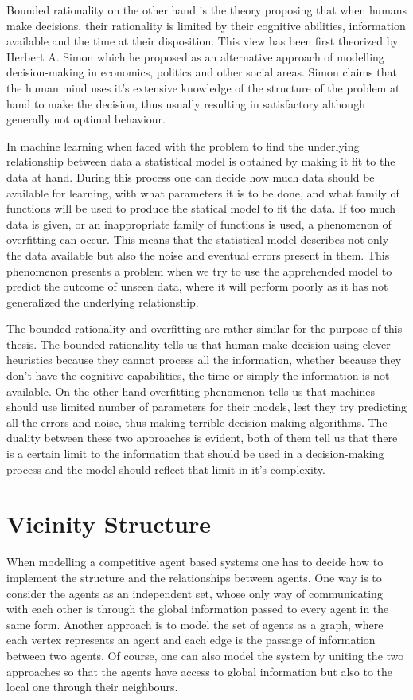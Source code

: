 Bounded rationality on the other hand is the theory proposing that when humans make decisions, their rationality is limited by their cognitive abilities, information available and the time at their disposition.
This view has been first theorized by Herbert A. Simon which he proposed as an alternative approach of modelling decision-making in economics, politics and other social areas. 
Simon claims that the human mind uses it's extensive knowledge of the structure of the problem at hand to make the decision, thus usually resulting in satisfactory although generally not optimal behaviour.

In machine learning when faced with the problem to find the underlying relationship between data a statistical model is obtained by making it fit to the data at hand.
During this process one can decide how much data should be available for learning, with what parameters it is to be done, and what family of functions will be used to produce the statical model to fit the data.
If too much data is given, or an inappropriate family of functions is used, a phenomenon of overfitting can occur.
This means that the statistical model describes not only the data available but also the noise and eventual errors present in them.
This phenomenon presents a problem when we try to use the apprehended model to predict the outcome of unseen data, where it will perform poorly as it has not generalized the underlying relationship.

The bounded rationality and overfitting are rather similar for the purpose of this thesis.
The bounded rationality tells us that human make decision using clever heuristics because they cannot process all the information, whether because they don't have the cognitive capabilities, the time or simply the information is not available.
On the other hand overfitting phenomenon tells us that machines should use limited number of parameters for their models, lest they try predicting all the errors and noise, thus making terrible decision making algorithms.
The duality between these two approaches is evident, both of them tell us that there is a certain limit to the information that should be used in a decision-making process and the model should reflect that limit in it's complexity.

\section{Vicinity Structure}
\label{1:vicinity}

When modelling a competitive agent based systems one has to decide how to implement the structure and the relationships between agents.
One way is to consider the agents as an independent set, whose only way of communicating with each other is through the global information passed to every agent in the same form.
Another approach is to model the set of agents as a graph, where each vertex represents an agent and each edge is the passage of information between two agents.
Of course, one can also model the system by uniting the two approaches so that the agents have access to global information but also to the local one through their neighbours.

